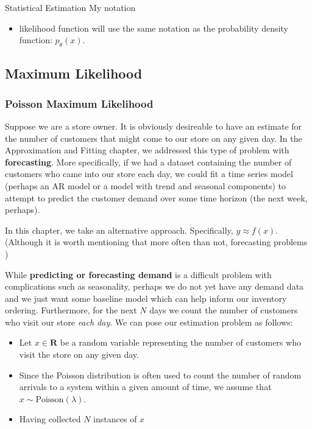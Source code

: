 \begin{chapter}{Statistical Estimation}
    My notation
    \begin{itemize}
        \item likelihood function will use the same notation as the probability density function: $p_{\theta}(x)$.
    \end{itemize}


    \subsection{Maximum Likelihood}

    \subsubsection{Poisson Maximum Likelihood}

    Suppose we are a store owner. It is obviously desireable to have an estimate for the number of customers
    that might come to our store on any given day. In the Approximation and Fitting chapter, we addressed this type
    of problem with \textbf{forecasting}. More specifically, if we had a dataset containing the number of customers
    who came into our store each day, we could fit a time series model (perhaps an AR model or a model with trend and seasonal components) to attempt to predict the 
    customer demand over some time horizon (the next week, perhaps).

    In this chapter, we take an alternative approach. Specifically, $y \approx f(x)$. (Although it is worth mentioning that more often than not,
    forecasting problems )
    
    While \textbf{predicting or forecasting demand} is a 
    difficult problem with complications such as seasonality, perhaps we do not yet have any demand data and we just
    want some baseline model which can help inform our inventory ordering. Furthermore, for the next $N$ days we count the number
    of customers who visit our store \textit{each day}. We can pose our estimation problem as follows:
    \begin{itemize}
        \item Let $x \in \mathbf{R}$ be a random variable representing the number of customers who visit
        the store on any given day.
        \item Since the Poisson distribution is often used to count the number of random arrivals to
        a system within a given amount of time, we assume that $x \sim \text{Poisson}(\lambda)$.
        \item Having collected $N$ instances of $x$ %
    \end{itemize}
    

\end{chapter}

